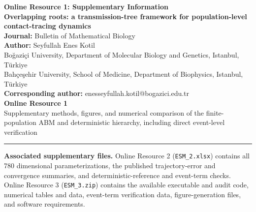 \documentclass[11pt]{article}
\begin{document}
\begin{center}
{\Large\bfseries Online Resource 1: Supplementary Information}\\[1.0em]
{\large\bfseries Overlapping roots: a transmission-tree framework for population-level contact-tracing dynamics}\\[1.2em]
{\bfseries Journal:} Bulletin of Mathematical Biology\\[0.5em]
{\bfseries Author:} Seyfullah Enes Kotil\\[0.4em]
Boğaziçi University, Department of Molecular Biology and Genetics, Istanbul, Türkiye\\
Bahçeşehir University, School of Medicine, Department of Biophysics, Istanbul, Türkiye\\[0.5em]
{\bfseries Corresponding author:} enesseyfullah.kotil@bogazici.edu.tr\\[1.2em]
{\bfseries Online Resource 1}\\
Supplementary methods, figures, and numerical comparison of the finite-population ABM and deterministic hierarchy, including direct event-level verification
\end{center}
\vspace{0.5em}\hrule\vspace{1em}

\textbf{Associated supplementary files.} Online Resource 2 (\texttt{ESM\_2.xlsx}) contains all 780 dimensional parameterizations, the published trajectory-error and convergence summaries, and deterministic-reference and event-term checks. Online Resource 3 (\texttt{ESM\_3.zip}) contains the available executable and audit code, numerical tables and data, event-term verification data, figure-generation files, and software requirements.
\end{document}
